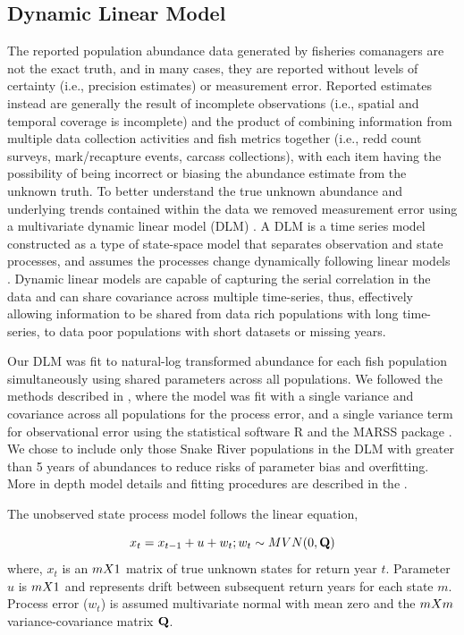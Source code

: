 \documentclass[10pt,a4paper]{article}
\begin{document}
\subsection{Dynamic Linear Model}\label{dynamic-linear-model}

The reported population abundance data generated by fisheries comanagers are not the exact truth, and in many cases, they are reported without levels of certainty (i.e., precision estimates) or measurement error. Reported estimates instead are generally the result of incomplete observations (i.e., spatial and temporal coverage is incomplete) and the product of combining information from multiple data collection activities and fish metrics together (i.e., redd count surveys, mark/recapture events, carcass collections), with each item having the possibility of being incorrect or biasing the abundance estimate from the unknown truth. To better understand the true unknown abundance and underlying trends contained within the data we removed measurement error using a multivariate dynamic linear model (DLM) \autocite{zuur_estimating_2003}. A DLM is a time series model constructed as a type of state-space model that separates observation and state processes, and assumes the processes change dynamically following linear models \autocite{royle_hierarchical_2008}. Dynamic linear models are capable of capturing the serial correlation in the data and can share covariance across multiple time-series, thus, effectively allowing information to be shared from data rich populations with long time-series, to data poor populations with short datasets or missing years.

Our DLM was fit to natural-log transformed abundance for each fish population simultaneously using shared parameters across all populations. We followed the methods described in \textcite{ford_biological_2022}, where the model was fit with a single variance and covariance across all populations for the process error, and a single variance term for observational error using the statistical software R \autocite{R-base} and the MARSS package \autocite{holmes_marss_2012,R-MARSS}. We chose to include only those Snake River populations in the DLM with greater than 5 years of abundances to reduce risks of parameter bias and overfitting. More in depth model details and fitting procedures are described in the \textcite{ford_biological_2022}.

The unobserved state process model follows the linear equation,

\[
x_t = x_{t-1} + u + w_t; \\
w_t \sim MVN(0,\mathbf{Q})
\]
where, \(x_t\) is an \(m \space X \space 1\) matrix of true unknown states for return year \(t\). Parameter \(u\) is \(m \space X \space 1\) and represents drift between subsequent return years for each state \(m\). Process error (\(w_t\)) is assumed multivariate normal with mean zero and the \(m \space X \space m\) variance-covariance matrix \(\bf{Q}\).
\end{document}
